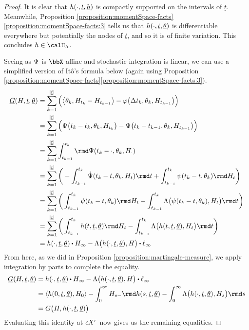 \begin{proof}
  \label{proof:theorem:equivalence}
  It is clear that $h(\cdot, \underline t, \underline{h})$ is compactly supported on the intervals of $\underline t$.
  Meanwhile, Proposition \ref{proposition:momentSpace-facts}\ref{proposition:momentSpace-facts:3} tells us that $h(\cdot, \underline t, \underline{\theta})$ is differentiable everywhere but potentially the nodes of $\underline t$, and so it is of finite variation.
  This concludes $\twistFunc \in \twistSpace$.

  Seeing as $\Psi$ is $\stateSpace$-affine and stochastic integration is linear, we can use a simplified version of It\^o's formula below (again using Proposition \ref{proposition:momentSpace-facts}\ref{proposition:momentSpace-facts:3}).
  \begin{align*}
    \fddRf(H, \underline t,\underline\twistVar)
    &= \sum_{k=1}^{|\underline t|} \Big( \bprj{\twistVar_k}{H_{t_k}-H_{t_{k-1}}} - \affShift\big(\Delta t_k, \twistVar_k, H_{t_{k-1}}\big) \Big) \\
    &= \sum_{k=1}^{|\underline t|} \Big( \aff\big(t_k-t_k, \twistVar_k, H_{t_k}\big) - \aff\big(t_k-t_{k-1}, \twistVar_k, H_{t_{k-1}}\big) \Big) \\
    &= \sum_{k=1}^{|\underline t|}  \int_{t_{k-1}}^{t_k} \rmd \aff(t_k-\cdot, \twistVar_k, H_\cdot) \\
    &= \sum_{k=1}^{|\underline t|} \bigg( -\int_{t_{k-1}}^{t_k} \dot\aff(t_k-t, \twistVar_k, H_t) \rmd t + \int_{t_{k-1}}^{t_k} \affPart(t_k-t,\twistVar_k) \rmd H_t \bigg) \\
    &= \sum_{k=1}^{|\underline t|} \bigg( \int_{t_{k-1}}^{t_k} \affPart(t_k-t, \twistVar_k) \rmd H_t - \int_{t_{k-1}}^{t_k} \ode\big(\affPart(t_k-t, \twistVar_k), H_t\big) \rmd t \bigg) \\
    &= \sum_{k=1}^{|\underline t|} \bigg( \int_{t_{k-1}}^{t_k} \twistFunc(t, \underline t, \underline\twistVar) \rmd H_t - \int_{t_{k-1}}^{t_k} \ode\big(\twistFunc(t, \underline t, \underline\twistVar), H_t\big) \rmd t \bigg) \\
    &= \twistFunc(\cdot, \underline t, \underline\twistVar) \shortInt H_\infty - \ode\big(\twistFunc(\cdot, \underline t, \underline\twistVar), H\big) \shortInt \leb_\infty
  \end{align*}
  From here, as we did in Proposition \ref{proposition:martingale-measure}, we apply integration by parts to complete the equality.
  \begin{align*}
    \fddRf(H, \underline t,\underline\twistVar)
    &=\twistFunc(\cdot, \underline t, \underline\twistVar) \shortInt H_\infty - \ode\big(\twistFunc(\cdot, \underline t, \underline\twistVar), H\big) \shortInt \leb_\infty \\
    &=\prj{\twistFunc(0,\underline t,\underline\twistVar)}{H_0} - \int_0^\infty H_{s-} \rmd\twistFunc(s,\underline t, \underline\twistVar) - \int_0^\infty \ode\big( \twistFunc(\cdot, \underline t, \underline\twistVar), H_s\big) \rmd s \\
    &= \mgRf\big(H, \twistFunc(\cdot,\underline t,\underline\twistVar)\big)
  \end{align*}
  Evaluating this identity at $\epsilon X^\epsilon$ now gives us the remaining equalities.
\end{proof}
